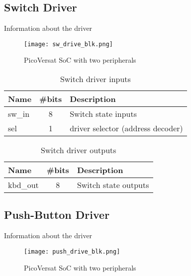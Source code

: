 \subsection{Switch Driver}

Information about the driver

\begin{figure}[!htbp]
    \centerline{\texttt{[image: sw\_drive\_blk.png]}}
    \vspace{0cm}\caption{PicoVersat SoC with two peripherals}
    \label{fig:periphs}
\end{figure}

\begin{table}[h!]
    \centering
    \caption{Switch driver inputs}
    \label{tab:swIn}
    \begin{tabular}{@{}lcl@{}}
    \toprule
    Name   & \multicolumn{1}{l}{\#bits} & Description                       \\ \midrule
    sw\_in & 8                          & Switch state inputs               \\
    sel    & 1                          & driver selector (address decoder) \\ \bottomrule
    \end{tabular}
    \end{table}

\begin{table}[h!]
    \centering
    \caption{Switch driver outputs}
    \label{tab:swOut}
    \begin{tabular}{@{}lll@{}}
    \toprule
    Name     & \#bits                & Description          \\ \midrule
    kbd\_out & \multicolumn{1}{c}{8} & Switch state outputs \\ \bottomrule
    \end{tabular}
    \end{table}

\subsection{Push-Button Driver}

Information about the driver


\begin{figure}[!htbp]
    \centerline{\texttt{[image: push\_drive\_blk.png]}}
    \vspace{0cm}\caption{PicoVersat SoC with two peripherals}
    \label{fig:periphs}
\end{figure}

